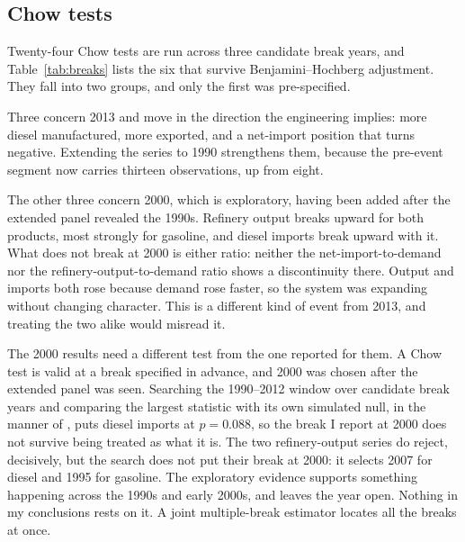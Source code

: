 \documentclass[11pt,a4paper]{article}
\begin{document}
\subsection{Chow tests}
\label{sec:chow}

Twenty-four Chow tests are run across three candidate break years, and Table~\ref{tab:breaks}
lists the six that survive Benjamini--Hochberg adjustment. They fall into two groups, and only
the first was pre-specified.

Three concern 2013 and move in the direction the engineering implies: more diesel manufactured,
more exported, and a net-import position that turns negative. Extending the series to 1990
strengthens them, because the pre-event segment now carries thirteen observations, up from
eight.

The other three concern 2000, which is exploratory, having been added after the extended panel
revealed the 1990s. Refinery output breaks upward for both products, most strongly for gasoline,
and diesel imports break upward with it. What does not break at 2000 is either ratio: neither
the net-import-to-demand nor the refinery-output-to-demand ratio shows a discontinuity there.
Output and imports both rose because demand rose faster, so the system was expanding without
changing character. This is a different kind of event from 2013, and treating the two alike
would misread it.

The 2000 results need a different test from the one reported for them. A Chow test is valid at a
break specified in advance, and 2000 was chosen after the extended panel was seen. Searching the
1990--2012 window over candidate break years and comparing the largest statistic with its own
simulated null, in the manner of \citet{andrews1993tests}, puts diesel imports at $p=0.088$, so
the break I report at 2000 does not survive being treated as what it is. The two refinery-output
series do reject, decisively, but the search does not put their break at 2000: it selects 2007
for diesel and 1995 for gasoline. The exploratory evidence supports something happening across
the 1990s and early 2000s, and leaves the year open. Nothing in my conclusions rests on it. A
joint multiple-break estimator \citep{bai1998estimating, bai2003computation} locates all the
breaks at once.
\end{document}
